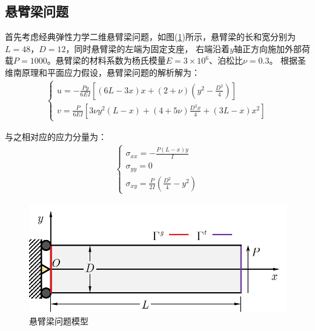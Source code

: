 \subsection{悬臂梁问题}
首先考虑经典弹性力学二维悬臂梁问题，如图(\ref{cantilever})所示，悬臂梁的长和宽分别为$L=48$，$D=12$，同时悬臂梁的左端为固定支座，
右端沿着$y$轴正方向施加外部荷载$P=1000$。悬臂梁的材料系数为杨氏模量$E=3\times10^6$、泊松比$\nu=0.3$。
根据圣维南原理和平面应力假设，悬臂梁问题的解析解为：
\begin{equation}
\begin{split}
\begin{cases}
    u = -\frac{Py}{6EI}[(6L-3x)x + (2+\nu)(y^2 - \frac{D^2}{4})] \\
    v = \frac{P}{6EI}[3\nu y^2(L-x) + (4+5\nu)\frac{D^2x}{4} + (3L-x)x^2]
\end{cases}
\end{split}
\end{equation}\par
与之相对应的应力分量为：
\begin{equation}
\begin{split}
\begin{cases}
   \sigma_{xx}=-\frac{P(L-x)y}{I}\\
   \sigma_{yy}=0\\
   \sigma_{xy}=\frac{P}{2I}(\frac{D^2}{4}-y^2)
\end{cases}
\end{split}
\end{equation}
\begin{figure}[!h]
    \centering
    \includegraphics[scale=0.7]{figure/cantilever/cantilever.png}
    \caption{悬臂梁问题模型}\label{cantilever}
\end{figure}
